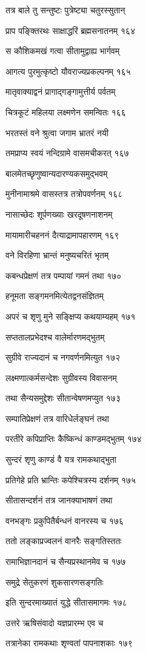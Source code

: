 तत्र बाले तु सन्तुष्टः पुत्रेष्ट्या चतुरस्सुतान्

प्राप पङ्क्तिरथः साक्षाद्धरिं ब्रह्मसनातनम् १६४

स कौशिकमखं गत्वा सीतामुद्वाह्य भार्गवम्

आगत्य पुरमुत्कृष्टो यौवराज्यप्रकल्पनम् १६५

मातृवाक्याद्वनं प्रागाद्गङ्गामुत्तीर्य पर्वतम्

चित्रकूटं महिलया लक्ष्मणेन समन्वितः १६६

भरतस्तं वने श्रुत्वा जगाम भ्रातरं नयी

तमप्राप्य स्वयं नन्दिग्रामे वासमचीकरत् १६७

बालमेतच्छृणुष्वान्यदारण्यकसमुद्भवम्

मुनीनामाश्रमे वासस्तत्र तत्रोपवर्णनम् १६८

नासाच्छेदः शूर्पणख्याः खरदूषणनाशनम्

मायामारीचहननं दैत्याद्रामापहारणम् १६९

वने विरहिणा भ्रान्तं मनुष्यचरितं भृतम्

कबन्धप्रेक्षणं तत्र पम्पायां गमनं तथा १७०

हनूमता सङ्गमनमित्येतद्वनसंज्ञितम्

अपरं च शृणु मुने सङ्क्षिप्य कथयाम्यहम् १७१

सप्ततालप्रभेदश्च वालेर्मारणमद्भुतम्

सुग्रीवे राज्यदानं च नगवर्णनमित्युत १७२

लक्ष्मणात्कर्मसन्देशः सुग्रीवस्य विवासनम्

तथा सैन्यसमुद्देशः सीतान्वेषणमप्युत १७३

सम्पातिप्रेक्षणं तत्र वारिधेर्लङ्घनं तथा

परतीरे कपिप्राप्तिः कैष्किन्धं काण्डमद्भुतम् १७४

सुन्दरं शृणु काण्डं वै यत्र रामकथाद्भुता

प्रतिगेहे प्रति भ्रान्तिः कपेश्चित्रस्य दर्शनम् १७५

सीतासन्दर्शनं तत्र जानक्याभाषणं तथा

वनभङ्गः प्रकुपितैर्बन्धनं वानरस्य च १७६

ततो लङ्काप्रज्वलनं वानरैः सङ्गतिस्ततः

रामाभिज्ञानदानं च सैन्यप्रस्थानमेव च १७७

समुद्रे सेतुकरणं शुकसारणसङ्गतिः

इति सुन्दरमाख्यातं युद्धे सीतासमागमः १७८

उत्तरे ऋषिसंवादो यज्ञप्रारम्भ एव च

तत्रानेका रामकथाः शृण्वतां पापनाशकाः १७९

